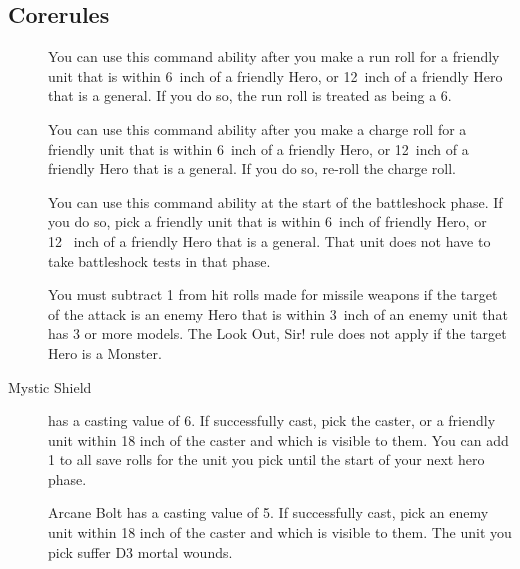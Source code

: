 \subsection{Corerules}
\begin{description}
    \item [] You can use this
        command ability after you make a run roll for a friendly unit that is
        within 6~inch of a friendly Hero, or
        12~inch of a friendly Hero that is a general.  If you do so, the run
        roll is treated as being a 6.  
    \item [] You can use
        this command ability after you make a charge roll for a friendly unit
        that is within 6~inch of a friendly Hero, or 12~inch of a friendly Hero
        that is a general.  If you do so, re-roll the charge roll.  
    \item [] You can use
        this command ability at the start of the battleshock phase. If you do
        so, pick a friendly unit that is within 6~inch of friendly Hero, or 12~
        inch  of a friendly Hero that is a general. That unit does not have to
        take battleshock tests in that phase.
    \item [] You must subtract
        1 from hit rolls made for missile weapons if the target of the attack
        is an enemy Hero that is within 3~inch of an enemy unit that has 3 or
        more models. The Look Out, Sir! rule does not apply if the target Hero
        is a Monster.
    \item [ {Mystic Shield}] has a casting value of 6.
        If successfully cast, pick the caster, or a friendly unit within 18
        inch of the caster and which is visible to them. You can add 1 to all
        save rolls for the unit you pick until the start of your next hero
        phase. 
    \item [] Arcane Bolt has a casting value
        of 5. If successfully cast, pick an enemy unit within 18 inch of the
        caster and which is visible to them. The unit you pick suffer D3 mortal
        wounds. 
\end{description}

